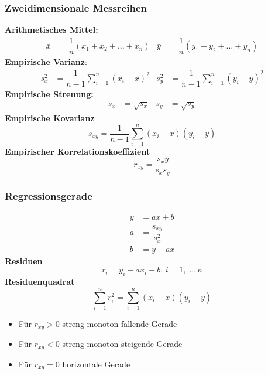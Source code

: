 \documentclass[
	ngerman,
	accentcolor=9c,%
	type=intern,
	marginpar=false
	]{tudapub}
\begin{document}
            \subsubsection{Zweidimensionale Messreihen}
                \textbf{Arithmetisches Mittel:}
                \begin{align*}
                    \bar{x}&=\dfrac{1}{n}(x_1+x_2+\dots+x_n) & \bar{y}&=\dfrac{1}{n}(y_1+y_2+\dots+y_n)
                \end{align*}
                \textbf{Empirische Varianz}:
                \begin{align*}
                    s_x^2 &= \dfrac{1}{n-1}\sum_{i=1}^n (x_i - \bar{x})^2 & s_y^2 &= \dfrac{1}{n-1}\sum_{i=1}^n (y_i - \bar{y})^2
                \end{align*}
                \textbf{Empirische Streuung:}
                \begin{align*}
                    s_x &= \sqrt{s_x} & s_y &= \sqrt{s_y}
                \end{align*}
                \textbf{Empirische Kovarianz}
                \begin{equation*}
                    s_{xy}= \dfrac{1}{n-1}\sum_{i=1}^n (x_i - \bar{x})(y_i - \bar{y})
                \end{equation*}
                \textbf{Empirischer Korrelationskoeffizient}
                \begin{equation*}
                    r_{xy} = \dfrac{s_xy}{s_x s_y}
                \end{equation*}
            \subsubsection{Regressionsgerade}
                \begin{align*}
                    y &= ax + b\\
                    a &= \dfrac{s_{xy}}{s_x^2}\\
                    b &= \bar{y} - a \bar{x}
                \end{align*}
                \textbf{Residuen}
                \begin{equation*}
                    r_i = y_i - a x_i - b \mbox{, }i = 1,\dots, n
                \end{equation*}
                \textbf{Residuenquadrat}
                \begin{equation*}
                    \sum_{i=1}^n r_i^2 = \sum_{i=1}^n (x_i - \bar{x})(y_i - \bar{y})
                \end{equation*}
                \begin{itemize}
                    \item Für $r_{xy} > 0$ streng monoton fallende Gerade
                    \item Für $r_{xy} < 0$ streng monoton steigende Gerade
                    \item Für $r_{xy} = 0$ horizontale Gerade
                \end{itemize}
\end{document}
